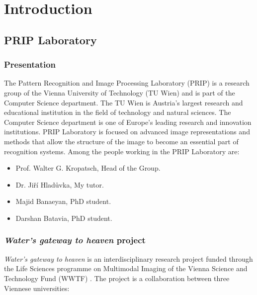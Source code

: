 \chapter{Introduction}

\section{PRIP Laboratory}

\subsection{Presentation}

The Pattern Recognition and Image Processing Laboratory (PRIP) is a research
group of the Vienna University of Technology (TU Wien) and is part of the
Computer Science department. The TU Wien is Austria's largest research and 
educational institution in the field of technology and natural sciences.
The Computer Science department is one of Europe's leading research and innovation 
institutions. PRIP Laboratory is focused on advanced image representations and methods 
that allow the structure of the image to become an essential part of recognition systems.
Among the people working in the PRIP Laboratory are:

\begin{itemize}
    \item Prof. Walter G. Kropatsch, Head of the Group.
    \item Dr. Jiří Hladůvka, My tutor.
    \item Majid Banaeyan, PhD student.
    \item Darshan Batavia, PhD student.
\end{itemize}

\subsection{\textit{Water's gateway to heaven} project}

\textit{Water's gateway to heaven} is an interdisciplinary research project funded 
through the Life Sciences programme on Multimodal Imaging of the Vienna Science and 
Technology Fund (WWTF) \cite{WWTF}. The project is a collaboration between three Viennese 
universities: 

